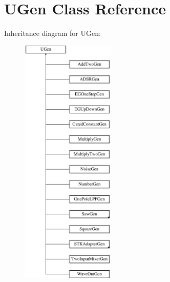 \hypertarget{classUGen}{}\section{U\+Gen Class Reference}
\label{classUGen}
Inheritance diagram for U\+Gen\+:\begin{figure}[H]
\begin{center}
\leavevmode
\includegraphics[height=12.000000cm]{classUGen}
\end{center}
\end{figure}
